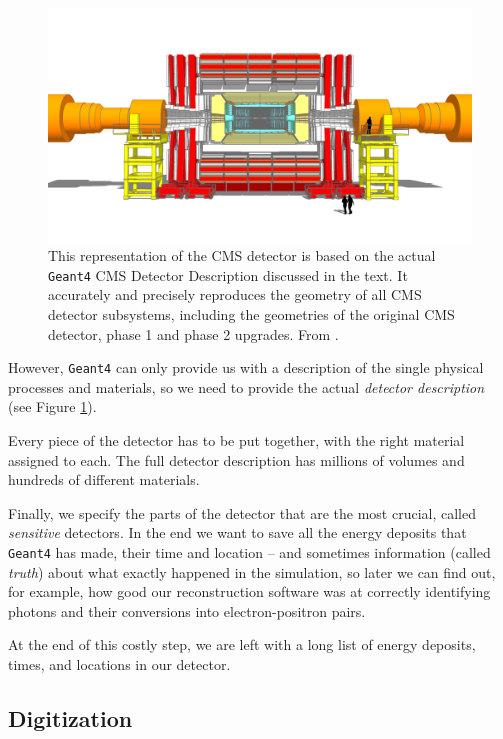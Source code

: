 \begin{figure}
    \centering
     \includegraphics[width=\columnwidth]{gfx/ch2/cms_160518_01_Scene_2.png}
    \caption[CMS model]{ This representation of the CMS detector is based on the actual \texttt{Geant4} CMS Detector Description discussed in the text. It accurately and precisely reproduces the geometry of all CMS detector subsystems, including the geometries of the original CMS detector, phase 1 and phase 2 upgrades.  From \cite{decmod}.}
    \label{fig:decmod}
\end{figure}


However, \texttt{Geant4} can only provide us with a description of the single physical processes and materials, so we need to provide the actual \emph{detector description} (see Figure \ref{fig:decmod}). 

Every piece of the detector has to be put together, with the right material assigned to each. The full detector description has millions of volumes and hundreds of different materials.

Finally, we specify the parts of the detector that are the most crucial, called \emph{sensitive} detectors. In the end we want to save all the energy deposits that  \texttt{Geant4} has made, their time and location – and sometimes information (called \emph{truth}) about what exactly happened in the simulation, so later we can find out, for example, how good our reconstruction software was at correctly identifying photons and their conversions into electron-positron pairs.

At the end of this costly step, we are left with a long list of energy deposits, times, and locations in our detector. 

\subsection{Digitization} 

